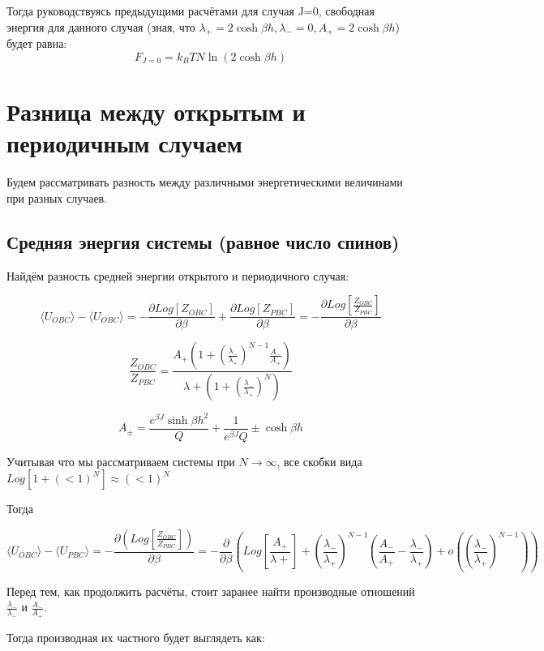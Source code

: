 \documentclass{article}
\newcommand{\bj}{\beta J}
\newcommand{\bh}{\beta h}
\newcommand{\lp}{\lambda_{+}}
\newcommand{\lm}{\lambda_{-}}
\newcommand{\ap}{A_{+}}
\newcommand{\am}{A_{-}}
\newcommand{\apm}{A_{\pm}}
\newcommand{\pbc}{_{PBC}}
\newcommand{\obc}{_{OBC}}
\newcommand{\la}{\langle}
\newcommand{\ra}{\rangle}
\numberwithin{equation}{section}
\begin{document}
Тогда руководствуясь предыдущими расчётами для случая J=0, свободная энергия для данного случая (зная, что $\lp = 2\cosh{\bh}, \lm = 0, A_{+} = 2\cosh{\bh}$) будет равна:
\[ F_{J=0} = k_{B}T N \ln{(2\cosh{\bh})}\]
\section{Разница между открытым и периодичным случаем}

Будем рассматривать разность между различными энергетическими величинами при разных случаев.

\subsection{Средняя энергия системы (равное число спинов)}


Найдём разность средней энергии открытого и периодичного случая:

\begin{equation}\label{DiffMeanE1}
    \la U\obc \ra - \la U\obc \ra = -\frac{\partial Log[Z\obc]}{\partial \beta} + \frac{\partial Log[Z\pbc]}{\partial \beta} = -\frac{\partial Log[\frac{Z\obc}{Z\pbc}]}{\partial \beta}
\end{equation}

\[ \frac{Z\obc}{Z\pbc} = \frac{A_{+}\left( 1 + (\frac{\lambda_{-}}{\lambda_{+}})^{N - 1}  \frac{A_{-}}{A_{+}}\right)}{\lambda{+}(1 + (\frac{\lambda_{-}}{\lambda_{+}})^{N})} \]

\[ \apm = \frac{e^{\bj} \sinh{\bh}^2}{Q} + \frac{1}{e^{\bj}Q} \pm \cosh{\bh} \]

Учитывая что мы рассматриваем системы при $N \rightarrow \infty$,
все скобки вида $ Log[ 1 + (<1)^{N} ] \approx (<1)^{N} $ 

Тогда

\begin{equation}\label{diffMeanE2}
     \la U\obc \ra - \la U\pbc \ra =  -\frac{\partial ( Log[\frac{Z\obc}{Z\pbc}])}{\partial \beta} = -\frac{\partial}{\partial \beta} \left(Log[\frac{A_{+}}{\lambda{+}}] + (\frac{\lambda_{-}}{\lambda_{+}})^{N - 1}(\frac{A_{-}}{A_{+}} - \frac{\lm}{\lp}) + o((\frac{\lambda_{-}}{\lambda_{+}})^{N-1})\right)
\end{equation}

Перед тем, как продолжить расчёты, стоит заранее найти производные отношений $\frac{\lm}{\lm}$ и $\frac{\am}{\ap}$. 

Тогда производная их частного будет выглядеть как:
\end{document}
